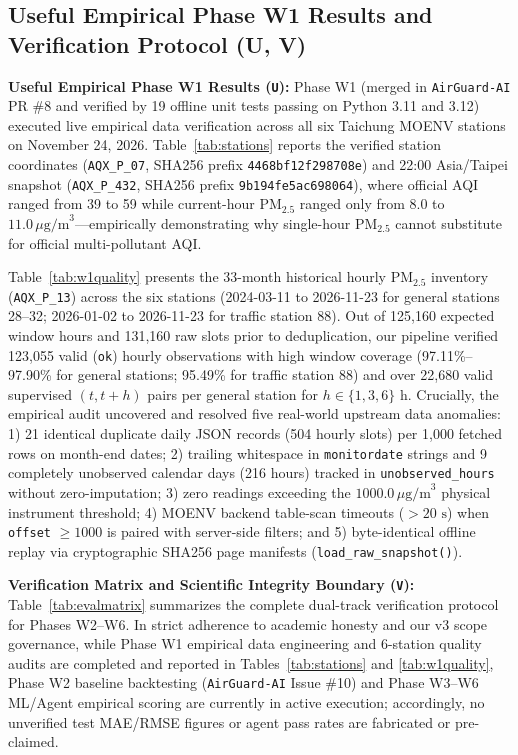 \subsection{Useful Empirical Phase W1 Results and Verification Protocol (U, V)}
\textbf{Useful Empirical Phase W1 Results (\texttt{U}):} Phase W1 (merged in \texttt{AirGuard-AI} PR \#8 and verified by 19 offline unit tests passing on Python 3.11 and 3.12) executed live empirical data verification across all six Taichung MOENV stations on November 24, 2026. Table~\ref{tab:stations} reports the verified station coordinates (\texttt{AQX\_P\_07}, SHA256 prefix \texttt{4468bf12f298708e}) and 22:00 Asia/Taipei snapshot (\texttt{AQX\_P\_432}, SHA256 prefix \texttt{9b194fe5ac698064}), where official AQI ranged from 39 to 59 while current-hour $\text{PM}_{2.5}$ ranged only from $8.0$ to $11.0\,\mu\text{g/m}^3$---empirically demonstrating why single-hour $\text{PM}_{2.5}$ cannot substitute for official multi-pollutant AQI.

Table~\ref{tab:w1quality} presents the 33-month historical hourly $\text{PM}_{2.5}$ inventory (\texttt{AQX\_P\_13}) across the six stations (2024-03-11 to 2026-11-23 for general stations 28--32; 2026-01-02 to 2026-11-23 for traffic station 88). Out of 125,160 expected window hours and 131,160 raw slots prior to deduplication, our pipeline verified 123,055 valid (\texttt{ok}) hourly observations with high window coverage (97.11\%--97.90\% for general stations; 95.49\% for traffic station 88) and over 22,680 valid supervised $(t, t+h)$ pairs per general station for $h \in \{1, 3, 6\}\text{ h}$. Crucially, the empirical audit uncovered and resolved five real-world upstream data anomalies: 1) 21 identical duplicate daily JSON records (504 hourly slots) per 1,000 fetched rows on month-end dates; 2) trailing whitespace in \texttt{monitordate} strings and 9 completely unobserved calendar days (216 hours) tracked in \texttt{unobserved\_hours} without zero-imputation; 3) zero readings exceeding the $1000.0\,\mu\text{g/m}^3$ physical instrument threshold; 4) MOENV backend table-scan timeouts ($>20\text{ s}$) when \texttt{offset} $\ge 1000$ is paired with server-side filters; and 5) byte-identical offline replay via cryptographic SHA256 page manifests (\texttt{load\_raw\_snapshot()}).

\textbf{Verification Matrix and Scientific Integrity Boundary (\texttt{V}):} Table~\ref{tab:evalmatrix} summarizes the complete dual-track verification protocol for Phases W2--W6. In strict adherence to academic honesty and our v3 scope governance, while Phase W1 empirical data engineering and 6-station quality audits are completed and reported in Tables~\ref{tab:stations} and \ref{tab:w1quality}, Phase W2 baseline backtesting (\texttt{AirGuard-AI} Issue \#10) and Phase W3--W6 ML/Agent empirical scoring are currently in active execution; accordingly, no unverified test MAE/RMSE figures or agent pass rates are fabricated or pre-claimed.
